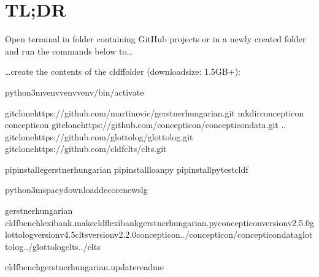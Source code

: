 \documentclass[letterpaper,10pt,english]{sphinxmanual}
\begin{document}
\sphinxstepscope


\chapter{TL;DR}
\label{\detokenize{TL;DR:id1}}\label{\detokenize{TL;DR::doc}}\label{\detokenize{TL;DR:module-gerstnerhungariancommands.__init__}}
\sphinxAtStartPar
Open terminal in folder containing GitHub projects
or in a newly created folder and run the commands below to…

\sphinxAtStartPar
…create the contents of the cldf\sphinxhyphen{}folder (downloadsize: 1.5GB+):

\begin{sphinxVerbatim}[commandchars=\\\{\}]
python3\PYGZhy{}mvenvvenvvenv/bin/activate

gitclonehttps://github.com/martino\PYGZhy{}vic/gerstnerhungarian.git
mkdirconcepticon
concepticon
gitclonehttps://github.com/concepticon/concepticon\PYGZhy{}data.git
..
gitclonehttps://github.com/glottolog/glottolog.git
gitclonehttps://github.com/cldf\PYGZhy{}clts/clts.git

pipinstall\PYGZhy{}egerstnerhungarian
pipinstallloanpy
pipinstallpytest\PYGZhy{}cldf

python3\PYGZhy{}mspacydownloadde\PYGZus{}core\PYGZus{}news\PYGZus{}lg

gerstnerhungarian
cldfbenchlexibank.makecldflexibank\PYGZus{}gerstnerhungarian.py\PYGZhy{}\PYGZhy{}concepticon\PYGZhy{}versionv2.5.0\PYGZhy{}\PYGZhy{}glottolog\PYGZhy{}versionv4.5\PYGZhy{}\PYGZhy{}clts\PYGZhy{}versionv2.2.0\PYGZhy{}\PYGZhy{}concepticon../concepticon/concepticon\PYGZhy{}data\PYGZhy{}\PYGZhy{}glottolog../glottolog\PYGZhy{}\PYGZhy{}clts../clts

cldfbenchgerstnerhungarian.update\PYGZus{}readme
\end{sphinxVerbatim}
\end{document}

